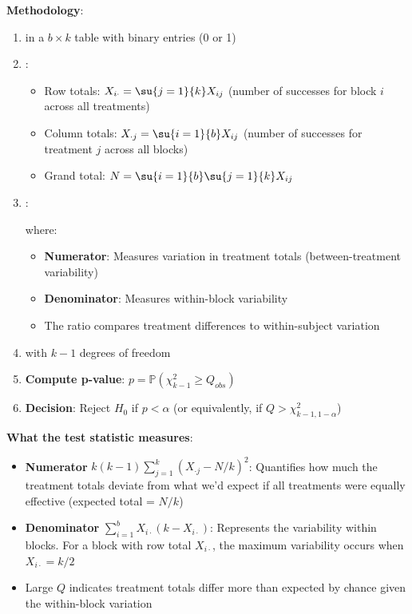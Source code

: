 \textbf{Methodology}:
\begin{enumerate}
    \item {} in a $b \times k$ table with binary entries (0 or 1)

    \item {}:
        \begin{itemize}
            \item Row totals: $X_{i\cdot} = \su{j=1}{k}X_{ij}$ (number of successes for block $i$ across all treatments)
            \item Column totals: $X_{\cdot j} = \su{i=1}{b}X_{ij}$ (number of successes for treatment $j$ across all blocks)
            \item Grand total: $N = \su{i=1}{b}\su{j=1}{k}X_{ij}$
        \end{itemize}

    \item {}:
        \begin{center}
        \end{center}

        where:
        \begin{itemize}
            \item \textbf{Numerator}: Measures variation in treatment totals (between-treatment variability)
            \item \textbf{Denominator}: Measures within-block variability
            \item The ratio compares treatment differences to within-subject variation
        \end{itemize}

    \item {} with $k-1$ degrees of freedom

    \item \textbf{Compute p-value}: $p = \mathbb{P}(\chi^2_{k-1} \geq Q_{obs})$

    \item \textbf{Decision}: Reject $H_0$ if $p < \alpha$ (or equivalently, if $Q > \chi^2_{k-1, 1-\alpha}$)
\end{enumerate}

\textbf{What the test statistic measures}:
\begin{itemize}
    \item \textbf{Numerator} $k(k-1)\sum_{j=1}^{k}(X_{\cdot j} - N/k)^2$: Quantifies how much the treatment
        totals deviate from what we'd expect if all treatments were equally effective (expected total = $N/k$)
    \item \textbf{Denominator} $\sum_{i=1}^{b}X_{i\cdot}(k - X_{i\cdot})$: Represents the variability within blocks.
        For a block with row total $X_{i\cdot}$, the maximum variability occurs when $X_{i\cdot} = k/2$
    \item Large $Q$ indicates treatment totals differ more than expected by chance given the within-block variation
\end{itemize}

